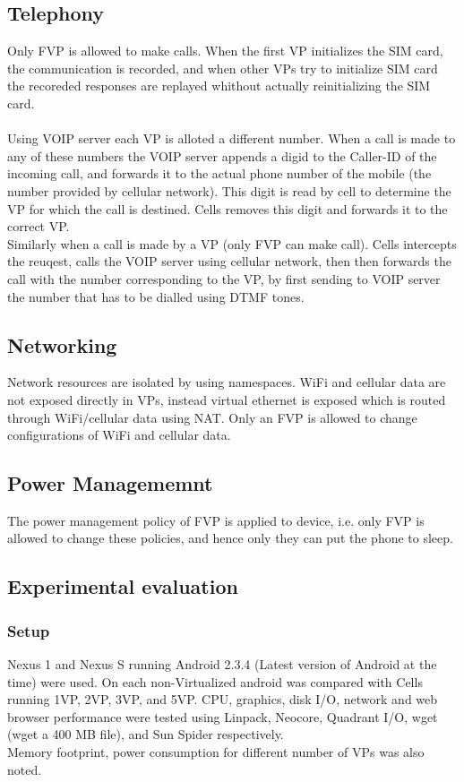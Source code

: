 \documentclass[a4paper,10pt]{article}
\begin{document}
\subsection*{Telephony}
Only FVP is allowed to make calls. When the first VP initializes the SIM card, the communication is recorded, and when other VPs try to initialize SIM card the recoreded responses are replayed whithout actually reinitializing the SIM card.
\\
\\
Using VOIP server each VP is alloted a different number. When a call is made to any of these numbers the VOIP server appends a digid to the Caller-ID of the incoming call, and forwards it to the actual phone number of the mobile (the number provided by cellular network). This digit is read by cell to determine
the VP for which the call is destined. Cells removes this digit and forwards it to the correct VP.
\\
Similarly when a call is made by a VP (only FVP can make call). Cells intercepts the reuqest, calls the VOIP server using cellular network, then then forwards the call with the number corresponding to the VP, by first sending to VOIP server the number that has to be dialled using DTMF tones.
 \subsection*{Networking}
 Network resources are isolated by using namespaces. WiFi and cellular data are not exposed directly in VPs, instead virtual ethernet is exposed which is routed through WiFi/cellular data using NAT.
 Only an FVP is allowed to change configurations of WiFi and cellular data.
 \subsection*{Power Managememnt}
 The power management policy of FVP is applied to device, i.e. only FVP is allowed to change these policies, and hence only they can put the phone to sleep.
 \subsection*{Experimental evaluation}
 
 \subsubsection*{Setup}
 Nexus 1 and Nexus S running Android 2.3.4 (Latest version of Android at the time) were used.
 On each non-Virtualized android was compared with Cells running 1VP, 2VP, 3VP, and 5VP.
 CPU, graphics, disk I/O, network and web browser performance were tested using Linpack, Neocore, Quadrant I/O, wget (wget a 400 MB file), and Sun Spider respectively.
 \\
 Memory footprint, power consumption for different number of VPs was also noted.
\end{document}
